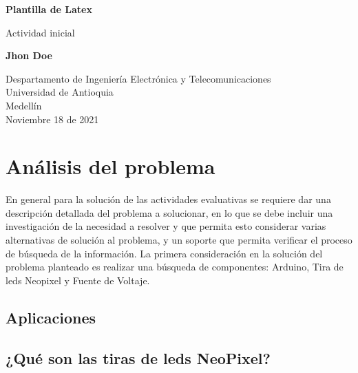 \documentclass{article}
\begin{document}
\begin{titlepage}
    \begin{center}
        \vspace*{1cm}
            
        \Huge
        \textbf{Plantilla de Latex}
            
        \vspace{0.5cm}
        \LARGE
        Actividad inicial
            
        \vspace{1.5cm}
            
        \textbf{Jhon Doe}

        \vfill
            
        \vspace{0.8cm}
            
        \Large
        Despartamento de Ingeniería Electrónica y Telecomunicaciones\\
        Universidad de Antioquia\\
        Medellín\\
        Noviembre 18 de 2021
            
    \end{center}
\end{titlepage}

\tableofcontents

\newpage
\section{Análisis del problema}\label{intro}
En general para la solución de las actividades evaluativas se requiere dar una descripción detallada del problema a solucionar, en lo que se debe incluir una investigación de la necesidad a resolver y que permita esto considerar varias alternativas de solución al problema, y un soporte que permita verificar el proceso de búsqueda de la información.\newline
La primera consideración en la solución del problema planteado es realizar una búsqueda de componentes: Arduino, Tira de leds Neopixel y Fuente de Voltaje.

\subsection{Aplicaciones}

\subsection{¿Qué son las tiras de leds NeoPixel?}
\end{document}
